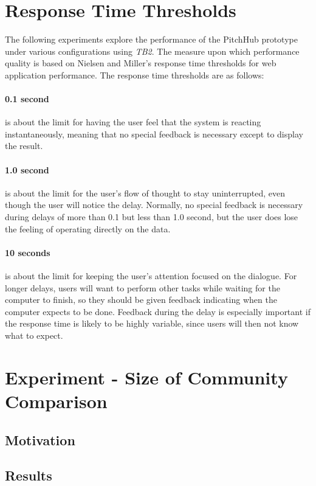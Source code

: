 \section{Response Time Thresholds}
The following experiments explore the performance of the PitchHub prototype under various configurations using \textit{TB2}. The measure upon which performance quality is based on Nielsen and Miller's response time thresholds \cite{Responsetime:online} for web application performance. 
The response time thresholds are as follows:
\paragraph{0.1 second} is about the limit for having the user feel that the system is reacting instantaneously, meaning that no special feedback is necessary except to display the result.
\paragraph{1.0 second} is about the limit for the user's flow of thought to stay uninterrupted, even though the user will notice the delay. Normally, no special feedback is necessary during delays of more than 0.1 but less than 1.0 second, but the user does lose the feeling of operating directly on the data.
\paragraph{10 seconds} is about the limit for keeping the user's attention focused on the dialogue. For longer delays, users will want to perform other tasks while waiting for the computer to finish, so they should be given feedback indicating when the computer expects to be done. Feedback during the delay is especially important if the response time is likely to be highly variable, since users will then not know what to expect.

\section{Experiment  - Size of Community Comparison}

\subsection{Motivation}

\subsection{Results}

